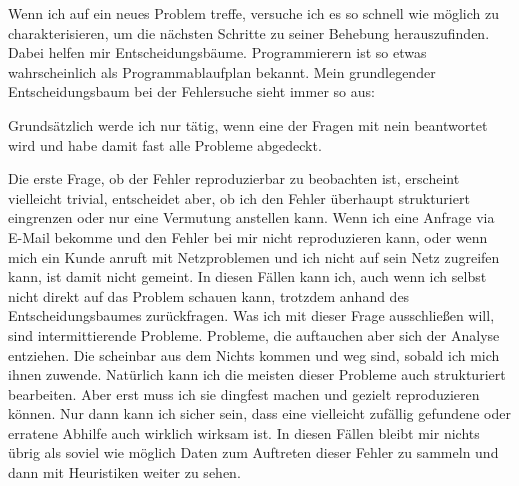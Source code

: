 \begin{normaltext}
  Wenn ich auf ein neues Problem treffe, versuche ich es so schnell wie
  möglich zu charakterisieren, um die nächsten Schritte zu seiner Behebung
  herauszufinden.
  Dabei helfen mir Entscheidungsbäume. Programmierern ist so etwas
  wahrscheinlich als Programmablaufplan bekannt. Mein grundlegender
  Entscheidungsbaum bei der Fehlersuche sieht immer so aus:


  Grundsätzlich werde ich nur tätig, wenn eine der Fragen mit nein beantwortet
  wird und habe damit fast alle Probleme abgedeckt.

  Die erste Frage, ob der Fehler reproduzierbar zu beobachten ist, erscheint
  vielleicht trivial, entscheidet aber, ob ich den Fehler überhaupt
  strukturiert eingrenzen oder nur eine Vermutung anstellen kann.
  Wenn ich eine Anfrage via E-Mail bekomme und den Fehler bei mir nicht
  reproduzieren kann, oder wenn mich ein Kunde anruft mit Netzproblemen und
  ich nicht auf sein Netz zugreifen kann, ist damit nicht gemeint. In diesen
  Fällen kann ich, auch wenn ich selbst nicht direkt auf das Problem schauen
  kann, trotzdem anhand des Entscheidungsbaumes zurückfragen. Was ich mit
  dieser Frage ausschließen will, sind intermittierende Probleme. Probleme,
  die auftauchen aber sich der Analyse entziehen. Die scheinbar aus dem Nichts
  kommen und weg sind, sobald ich mich ihnen zuwende. Natürlich kann ich
  die meisten dieser Probleme auch strukturiert bearbeiten. Aber erst muss ich
  sie dingfest machen und gezielt reproduzieren können. Nur dann kann ich
  sicher sein, dass eine vielleicht zufällig gefundene oder erratene Abhilfe
  auch wirklich wirksam ist. In diesen Fällen bleibt mir nichts übrig als
  soviel wie möglich Daten zum Auftreten dieser Fehler zu sammeln und dann mit
  Heuristiken weiter zu sehen.


\end{normaltext}
